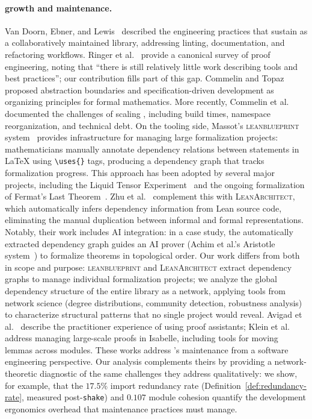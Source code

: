 \paragraph{ growth and maintenance.}
Van Doorn, Ebner, and Lewis~\cite{vandoorn2020} described the engineering practices that sustain  as a collaboratively maintained library, addressing linting, documentation, and refactoring workflows. Ringer et al.~\cite{ringer2019} provide a canonical survey of proof engineering, noting that ``there is still relatively little work describing tools and best practices''; our contribution fills part of this gap. Commelin and Topaz~\cite{commelin2023} proposed abstraction boundaries and specification-driven development as organizing principles for formal mathematics. More recently, Commelin et al.~\cite{baanen2025} documented the challenges of scaling , including build times, namespace reorganization, and technical debt. On the tooling side, Massot's \textsc{leanblueprint} system~\cite{massot2020leanblueprint} provides infrastructure for managing large formalization projects: mathematicians manually annotate dependency relations between statements in \LaTeX{} using \verb|\uses{}| tags, producing a dependency graph that tracks formalization progress. This approach has been adopted by several major projects, including the Liquid Tensor Experiment~\cite{lean_liquid} and the ongoing formalization of Fermat's Last Theorem~\cite{flt_lean}. Zhu et al.~\cite{zhu2025leanarchitect} complement this with \textsc{LeanArchitect}, which automatically infers dependency information from Lean source code, eliminating the manual duplication between informal and formal representations. Notably, their work includes AI integration: in a case study, the automatically extracted dependency graph guides an AI prover (Achim et al.'s Aristotle system~\cite{achim2025aristotle}) to formalize theorems in topological order. Our work differs from both in scope and purpose: \textsc{leanblueprint} and \textsc{LeanArchitect} extract dependency graphs to manage individual formalization projects; we analyze the global dependency structure of the entire  library as a network, applying tools from network science (degree distributions, community detection, robustness analysis) to characterize structural patterns that no single project would reveal. Avigad et al.~\cite{avigad2025anatomy} describe the practitioner experience of using proof assistants; Klein et al.~\cite{klein2012} address managing large-scale proofs in Isabelle, including tools for moving lemmas across modules. These works address 's maintenance from a software engineering perspective. Our analysis complements theirs by providing a network-theoretic diagnostic of the same challenges they address qualitatively: we show, for example, that the $17.5\%$ import redundancy rate (Definition~\ref{def:redundancy-rate}, measured post-\texttt{shake}) and $0.107$ module cohesion quantify the development ergonomics overhead that maintenance practices must manage.

